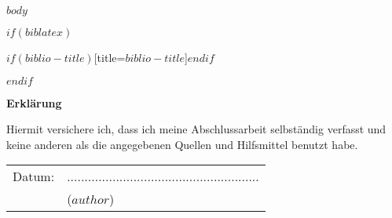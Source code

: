 \documentclass[12pt,a4paper,bibliography=totocnumbered,listof=totocnumbered]{scrartcl}
\begin{document}

\renewcommand{\sectionmark}[1]{\markright{#1}}
\renewcommand{\subsectionmark}[1]{}
\renewcommand{\subsubsectionmark}[1]{}
\rhead{} %

\onehalfspacing
\renewcommand{\thesection}{\arabic{section}}
\renewcommand{\theHsection}{\arabic{section}}
\setcounter{section}{0}
\setcounter{page}{1}


$body$



$if(biblatex)$
\renewcommand\refname{Quellenverzeichnis}


\pagebreak

\printbibliography$if(biblio-title)$[title=$biblio-title$]$endif$

$endif$

\newpage
\thispagestyle{empty}
\begin{center}
	\vspace*{5em}
	\huge\textbf{Erklärung}\\
\end{center}
\vspace{2em}
Hiermit versichere ich, dass ich meine Abschlussarbeit selbständig verfasst und keine anderen als die angegebenen Quellen und Hilfsmittel benutzt habe.

\vspace{4em}
\begin{minipage}{\linewidth}
	\begin{tabular}{p{15em}p{15em}}
		Datum: &  .......................................................\\
		& \centering ($author$)\\
	\end{tabular}
\end{minipage}
\end{document}
